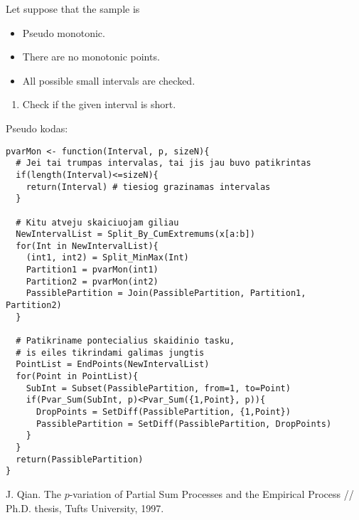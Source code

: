 \documentclass[12pt, a4paper]{article}
\numberwithin{equation}{section}
\begin{document}
Let suppose that the sample is
\begin{itemize}
  \item Pseudo monotonic.
  \item There are no monotonic points.
  \item All possible small intervals are checked.
\end{itemize}


\begin{enumerate}
  \item Check if the given interval is short.



\end{enumerate}

Pseudo kodas:
\begin{lstlisting}
pvarMon <- function(Interval, p, sizeN){
  # Jei tai trumpas intervalas, tai jis jau buvo patikrintas 
  if(length(Interval)<=sizeN){
    return(Interval) # tiesiog grazinamas intervalas  
  }

  # Kitu atveju skaiciuojam giliau
  NewIntervalList = Split_By_CumExtremums(x[a:b])
  for(Int in NewIntervalList){
    (int1, int2) = Split_MinMax(Int)
    Partition1 = pvarMon(int1)
    Partition2 = pvarMon(int2)
    PassiblePartition = Join(PassiblePartition, Partition1, Partition2)
  }

  # Patikriname pontecialius skaidinio tasku,
  # is eiles tikrindami galimas jungtis
  PointList = EndPoints(NewIntervalList)
  for(Point in PointList){
    SubInt = Subset(PassiblePartition, from=1, to=Point)
    if(Pvar_Sum(SubInt, p)<Pvar_Sum({1,Point}, p)){
      DropPoints = SetDiff(PassiblePartition, {1,Point})
      PassiblePartition = SetDiff(PassiblePartition, DropPoints)
    }  
  }  
  return(PassiblePartition) 
}
\end{lstlisting}
  
  
\begin{thebibliography}{99}  
   J. Qian. The $p$-variation of Partial Sum Processes
  and the Empirical Process // Ph.D. thesis, Tufts University, 1997.
\end{thebibliography}

 
\end{document}
